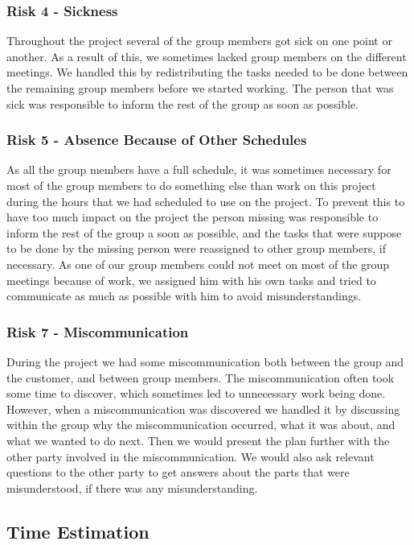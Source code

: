 \documentclass[../document]{subfiles}
\begin{document}
\subsubsection{Risk 4 - Sickness}
Throughout the project several of the group members got sick on one point or another. As a result of this, we sometimes lacked group members on the different meetings. We handled this by redistributing the tasks needed to be done between the remaining group members before we started working. The person that was sick was responsible to inform the rest of the group as soon as possible. 

\subsubsection{Risk 5 - Absence Because of Other Schedules}
As all the group members have a full schedule, it was sometimes necessary for most of the group members to do something else than work on this project during the hours that we had scheduled to use on the project. To prevent this to have too much impact on the project the person missing was responsible to inform the rest of the group a soon as possible, and the tasks that were suppose to be done by the missing person were reassigned to other group members, if necessary. As one of our group members could not meet on most of the group meetings because of work, we assigned him with his own tasks and tried to communicate as much as possible with him to avoid misunderstandings. 

\subsubsection{Risk 7 - Miscommunication}
During the project we had some miscommunication both between the group and the customer, and between group members. The miscommunication often took some time to discover, which sometimes led to unnecessary work being done. However, when a miscommunication was discovered we handled it by discussing within the group why the miscommunication occurred, what it was about, and what we wanted to do next. Then we would present the plan further with the other party involved in the miscommunication. We would also ask relevant questions to the other party to get answers about the parts that were misunderstood, if there was any misunderstanding. 

\subsection{Time Estimation}
\end{document}
